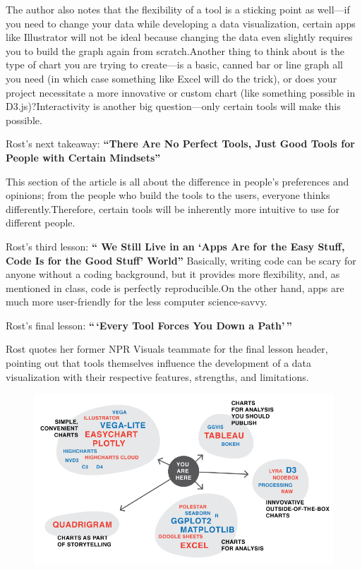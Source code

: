 \documentclass[]{book}
\theoremstyle{definition}
\theoremstyle{definition}
\theoremstyle{definition}
\theoremstyle{remark}
\begin{document}
The author also notes that the flexibility of a tool is a sticking point
as well---if you need to change your data while developing a data
visualization, certain apps like Illustrator will not be ideal because
changing the data even slightly requires you to build the graph again
from scratch.Another thing to think about is the type of chart you are
trying to create---is a basic, canned bar or line graph all you need (in
which case something like Excel will do the trick), or does your project
necessitate a more innovative or custom chart (like something possible
in D3.js)?Interactivity is another big question---only certain tools
will make this possible.

Rost's next takeaway: \textbf{``There Are No Perfect Tools, Just Good
Tools for People with Certain Mindsets''}

This section of the article is all about the difference in people's
preferences and opinions; from the people who build the tools to the
users, everyone thinks differently.Therefore, certain tools will be
inherently more intuitive to use for different people.

Rost's third lesson: \textbf{`` We Still Live in an `Apps Are for the
Easy Stuff, Code Is for the Good Stuff' World''} Basically, writing code
can be scary for anyone without a coding background, but it provides
more flexibility, and, as mentioned in class, code is perfectly
reproducible.On the other hand, apps are much more user-friendly for the
less computer science-savvy.

Rost's final lesson: \textbf{``\,`Every Tool Forces You Down a
Path'\,''}

Rost quotes her former NPR Visuals teammate for the final lesson header,
pointing out that tools themselves influence the development of a data
visualization with their respective features, strengths, and
limitations.

\begin{figure}
\centering
\includegraphics{images/tools_force_paths.png}
\caption{}
\end{figure}
\end{document}
